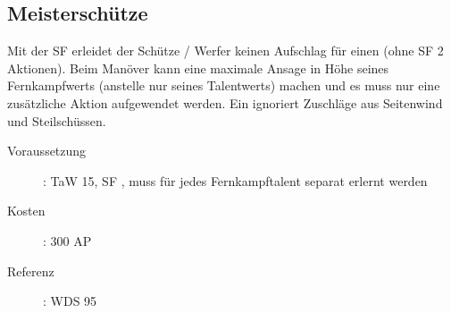 \subsection{Meisterschütze}
\label{sf.meisterschuetze}
Mit der SF  erleidet der Schütze / Werfer keinen Aufschlag für einen  (ohne SF 2 Aktionen).
Beim Manöver  kann eine maximale Ansage in Höhe seines Fernkampfwerts (anstelle nur seines Talentwerts) machen und es muss nur eine zusätzliche Aktion aufgewendet werden.
Ein  ignoriert Zuschläge aus Seitenwind und Steilschüssen.
\begin{description}
    \item[Voraussetzung]:
        TaW  15, SF , muss für jedes Fernkampftalent separat erlernt werden
    \item [Kosten]:
        300 AP
    \item [Referenz]:
        WDS 95
\end{description}
